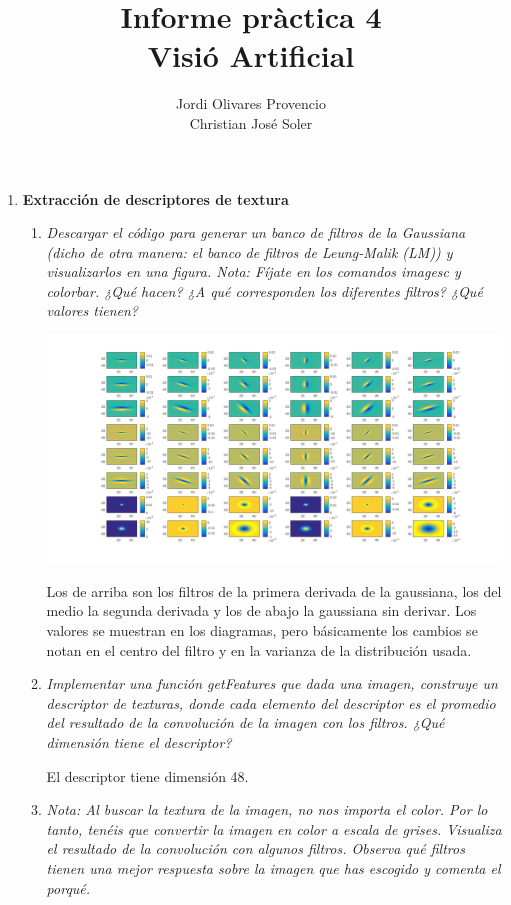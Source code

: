 \documentclass{article}
\title{Informe pràctica 4\\Visió Artificial}
\author{Jordi Olivares Provencio\\Christian José Soler}
\begin{document}
\maketitle

\begin{enumerate}

 \item \textbf{Extracción de descriptores de textura}

 \begin{enumerate}

 \item \textit{Descargar el código para generar un banco de filtros de la Gaussiana (dicho de otra manera: el banco de  filtros de Leung-Malik (LM)) 
 y visualizarlos en una figura. Nota: Fíjate en los comandos imagesc y colorbar. ¿Qué hacen? ¿A qué corresponden los diferentes filtros? ¿Qué valores tienen?}
 
\begin{center}
	\includegraphics[width=\textwidth]{im411.png}
\end{center}

  Los de arriba son los filtros de la primera derivada de la gaussiana, los del medio la segunda derivada y los de abajo la gaussiana sin derivar. 
  Los valores se muestran en los diagramas, pero básicamente los cambios se notan en el centro del filtro y en la varianza de la distribución usada.
 
 \item \textit{Implementar una  función getFeatures que dada una imagen, construye un descriptor de texturas, donde cada elemento del descriptor es el promedio del 
resultado de la convolución de la imagen con los filtros. ¿Qué dimensión tiene el descriptor? }

 El descriptor tiene dimensión 48.

 \item \textit{Nota: Al buscar la textura de la imagen, no nos importa el color. Por lo tanto, tenéis que convertir la imagen en color a escala de grises. 
 Visualiza el  resultado de la convolución con algunos  filtros. Observa qué  filtros tienen  una  mejor  respuesta  sobre  la  imagen  que  has  escogido  
 y  comenta  el porqué. }


\end{enumerate}
\end{enumerate}
\end{document}

